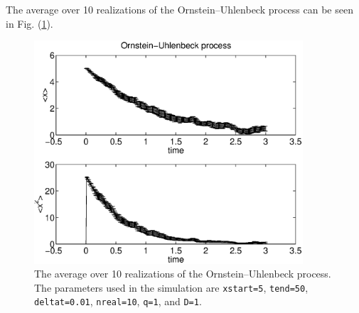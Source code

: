 The average over 10 realizations of the Ornstein--Uhlenbeck 
process can be seen in Fig. (\ref{F_ORNSTEIN}).
\begin{figure}
\label{F_ORNSTEIN}
\includegraphics[width=10cm]{./Figures/f_ornstein.eps}
\caption{The average over 10 realizations of the Ornstein--Uhlenbeck 
process. The
 parameters used in the simulation are \texttt{xstart=5},
\texttt{tend=50}, \texttt{deltat=0.01}, \texttt{nreal=10},
\texttt{q=1}, and \texttt{D=1}.}
\end{figure}








